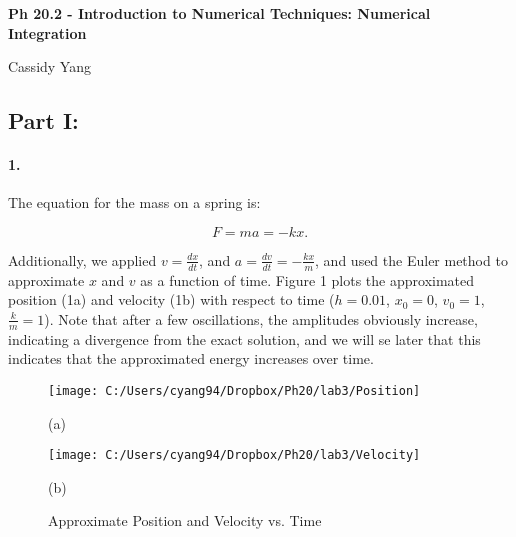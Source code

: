 \documentclass[english]{article}
\begin{document}
\begin{center}
\textbf{\Large{Ph 20.2 - Introduction to Numerical Techniques: Numerical
Integration}}
\par\end{center}{\Large \par}

\begin{center}
{\large{Cassidy Yang\bigskip{}
}}
\par\end{center}{\large \par}


\subsection*{Part I:}


\paragraph{1. }

The equation for the mass on a spring is:

\begin{equation}
F=ma=-kx.\label{eq:1}
\end{equation}


Additionally, we applied $v=\frac{dx}{dt}$, and $a=\frac{dv}{dt}=-\frac{kx}{m}$,
and used the Euler method to approximate $x$ and $v$ as a function
of time. Figure 1 plots the approximated position (1a) and velocity
(1b) with respect to time ($h=0.01$, $x_{0}=0$, $v_{0}=1$, $\frac{k}{m}=1$).
Note that after a few oscillations, the amplitudes obviously increase,
indicating a divergence from the exact solution, and we will se later
that this indicates that the approximated energy increases over time.

\begin{figure}[H]


\caption{Approximate Position and Velocity vs. Time}


\begin{minipage}[t]{0.5\columnwidth}%
\noindent \begin{center}
\texttt{[image: C:/Users/cyang94/Dropbox/Ph20/lab3/Position]}
\par\end{center}

\noindent \begin{center}
(a)
\par\end{center}%
\end{minipage}%
\begin{minipage}[t]{0.5\columnwidth}%
\noindent \begin{center}
\texttt{[image: C:/Users/cyang94/Dropbox/Ph20/lab3/Velocity]}
\par\end{center}

\noindent \begin{center}
(b)
\par\end{center}%
\end{minipage}

\end{figure}
\end{document}
